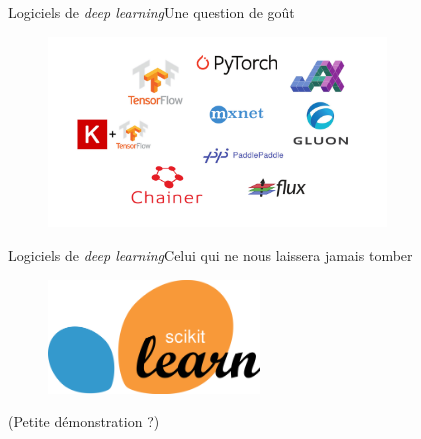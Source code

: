 \documentclass[12pt,dvipsnames,aspectratio=169]{beamer}
\begin{document}
\begin{frame}{Logiciels de \textit{deep learning}}{Une question de goût}

\begin{figure}
    \centering
    \includegraphics[width=0.8\textwidth]{figures/frameworks.pdf}
\end{figure}
    
\end{frame}

\begin{frame}{Logiciels de \textit{deep learning}}{Celui qui ne nous laissera jamais tomber}

\begin{figure}
    \centering
    \includegraphics[width=0.5\textwidth]{figures/sklearnlogo.png}
\end{figure}

\end{frame}

\begin{frame}{(Petite démonstration ?)}
    
\end{frame}
\end{document}
